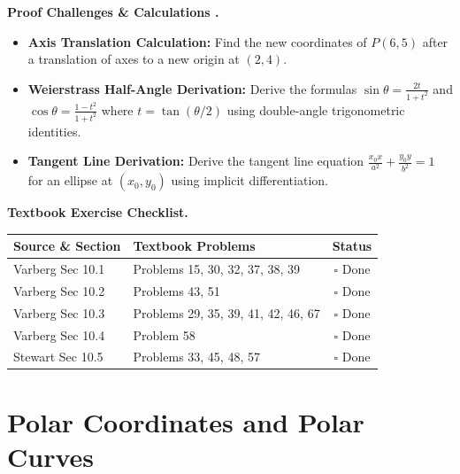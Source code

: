 \documentclass{natsirt}
\newcounter{topic}[section]
\newenvironment{challengebox}[1][]{%
    \begin{redbox}[#1]\refstepcounter{topic}\textbf{Proof Challenges \& Calculations \thesection.\thetopic}%
}{\end{redbox}}
\newenvironment{reviewbox}[1][]{\begin{whitebox}[#1]\textbf{Textbook Exercise Checklist. }}{\end{whitebox}}
\newcommand{\citem}{\item[$\square$]}
\begin{document}
\begin{challengebox}
    \begin{itemize}
        \citem \textbf{Axis Translation Calculation:} Find the new coordinates of $P(6, 5)$ after a translation of axes to a new origin at $(2, 4)$.
        \citem \textbf{Weierstrass Half-Angle Derivation:} Derive the formulas $\sin\theta = \frac{2t}{1+t^2}$ and $\cos\theta = \frac{1-t^2}{1+t^2}$ where $t = \tan(\theta/2)$ using double-angle trigonometric identities.
        \citem \textbf{Tangent Line Derivation:} Derive the tangent line equation $\frac{x_0 x}{a^2} + \frac{y_0 y}{b^2} = 1$ for an ellipse at $(x_0, y_0)$ using implicit differentiation.
    \end{itemize}
\end{challengebox}

\begin{reviewbox}
    \begin{center}
    \begin{tabular}{|l|l|c|}
        \hline
        \textbf{Source \& Section} & \textbf{Textbook Problems} & \textbf{Status} \\
        \hline
        Varberg Sec 10.1 & Problems 15, 30, 32, 37, 38, 39 & $\square$ Done \\
        Varberg Sec 10.2 & Problems 43, 51 & $\square$ Done \\
        Varberg Sec 10.3 & Problems 29, 35, 39, 41, 42, 46, 67 & $\square$ Done \\
        Varberg Sec 10.4 & Problem 58 & $\square$ Done \\
        Stewart Sec 10.5 & Problems 33, 45, 48, 57 & $\square$ Done \\
        \hline
    \end{tabular}
    \end{center}
\end{reviewbox}


\section{Polar Coordinates and Polar Curves}
\end{document}
